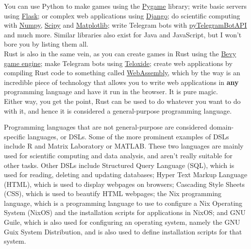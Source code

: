 \documentclass[11pt]{article}
\begin{document}
You can use Python to make games using the \href{https://www.pygame.org/news}{Pygame} library;
write basic servers using \href{https://flask.palletsprojects.com/en/3.0.x/}{Flask}; or complex web applications
using \href{https://www.djangoproject.com/}{Django}; do scientific computing with \href{https://numpy.org/}{Numpy},
\href{https://scipy.org/}{Scipy} and \href{https://matplotlib.org/}{Matplotlib}; write Telegram bots
with \href{https://pytba.readthedocs.io/en/latest/index.html}{pyTelegramBotAPI} and much more.
Similar libraries also exist for Java and JavaScript,
but I won't bore you by listing them all.  \\

Rust is also in the same vein, as you can create
games in Rust using the \href{https://bevyengine.org/}{Bevy game engine};
make Telegram bots using \href{https://github.com/teloxide/teloxide}{Teloxide}; create
web applications by compiling Rust code to something
called \href{https://webassembly.org/}{WebAssembly}, which by the way is an incredible piece
of technology that allows you to write web applications
in \textbf{any} programming language and
have it run in the browser. It is pure magic.  \\

Either way, you get the point, Rust can be used
to do whatever you want to do with it, and hence
it is considered a general-purpose programming language.

 \newpage

Programming languages that are not general-purpose
are considered domain-specific languages, or DSLs.
Some of the more prominent examples of DSLs include R
and Matrix Laboratory or MATLAB. These two languages
are mainly used for scientific computing and data analysis,
and aren't really suitable for other tasks.
Other DSLs include Structured Query Language (SQL),
which is used for reading, deleting and updating databases;
Hyper Text Markup Language (HTML), which is used to
display webpages on browsers;
Cascading Style Sheets (CSS), which is used to
beautify HTML webpages;
the Nix programming language,
which is a programming language to use to configure
a Nix Operating System (NixOS) and the
installation scripts for applications in NixOS;
and GNU Guile, which is also used for configuring
an operating system, namely the
GNU Guix System Distribution, and is also used
to define installation scripts for that system.
\end{document}
